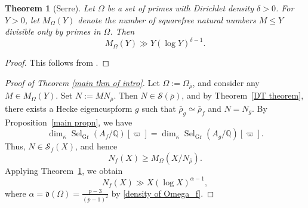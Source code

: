 \documentclass[table]{amsart}
\newtheorem{theorem}{Theorem}[section]
\newcommand{\Q}{\mathbb{Q}}
\newcommand{\cS}{\mathcal{S}}
\newcommand{\op}[1]{\operatorname{#1}}
\numberwithin{equation}{section}
\begin{document}
\begin{theorem}[Serre]\label{Serre thm}
Let \( \Omega \) be a set of primes with Dirichlet density \( \delta > 0 \). For \( Y > 0 \), let \( M_\Omega(Y) \) denote the number of squarefree natural numbers \( M \leq Y \) divisible only by primes in \( \Omega \). Then
\[
M_\Omega(Y) \gg Y (\log Y)^{\delta - 1}.
\]
\end{theorem}

\begin{proof}
This follows from \cite[Theorem 2.4]{serredivisibilite}.
\end{proof}



\begin{proof}[Proof of Theorem \ref{main thm of intro}]
Let \( \Omega := \Omega_{\bar{\rho}} \), and consider any \( M \in M_\Omega(Y) \). Set \( N := M N_{\bar{\rho}} \). Then \( N \in \cS(\bar{\rho}) \), and by Theorem~\ref{DT theorem}, there exists a Hecke eigencuspform \( g \) such that \( \bar{\rho}_g \simeq \bar{\rho}_f \) and \( N = N_g \). By Proposition~\ref{main propn}, we have
\[
\dim_\kappa \op{Sel}_{\op{Gr}}(A_f/\Q)[\varpi] = \dim_\kappa \op{Sel}_{\op{Gr}}(A_g/\Q)[\varpi].
\]
Thus, \( N \in \cS_f(X) \), and hence
\[
N_f(X) \geq M_{\Omega}(X / N_{\bar{\rho}}).
\]
Applying Theorem~\ref{Serre thm}, we obtain
\[
N_f(X) \gg X (\log X)^{\alpha - 1},
\]
where \( \alpha = \mathfrak{d}(\Omega) = \frac{p - 3}{(p - 1)^2} \) by \eqref{density of Omega_f}.
\end{proof}



\end{document}
